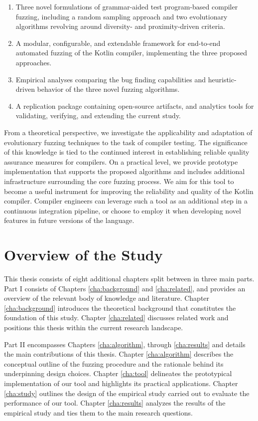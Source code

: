 \begin{enumerate}
	\item Three novel formulations of grammar-aided test program-based compiler fuzzing,
including a random sampling approach
and two evolutionary algorithms revolving
around diversity- and proximity-driven criteria.
	\item A modular, configurable, and extendable framework for
end-to-end automated fuzzing of the Kotlin compiler,
implementing the three proposed approaches.
	\item Empirical analyses comparing the bug finding capabilities
and heuristic-driven behavior of the three novel fuzzing algorithms.
	\item A replication package containing open-source artifacts, and analytics tools
for validating, verifying, and extending the current study.
\end{enumerate}

From a theoretical perspective, we investigate the applicability
and adaptation of evolutionary fuzzing techniques to the task of compiler testing. 
The significance of this knowledge is tied to the continued
interest in establishing reliable quality assurance measures for compilers.
On a practical level, we provide
prototype implementation that supports the proposed algorithms
and includes additional infrastructure surrounding the core fuzzing process.
We aim for this tool to become a useful instrument for improving the 
reliability and quality of the Kotlin compiler.
Compiler engineers can leverage such a tool as an additional
step in a continuous integration pipeline, or choose to employ it
when developing novel features in future versions of the language.

\section{Overview of the Study}

This thesis consists of eight additional chapters split between in three main parts.
Part I consists of Chapters \ref{cha:background} and \ref{cha:related}, and
provides an overview of the relevant body of knowledge and literature.
Chapter \ref{cha:background} introduces the theoretical background
that constitutes the foundation of this study.
Chapter \ref{cha:related} discusses related work and positions this
thesis within the current research landscape.

Part II encompasses Chapters \ref{cha:algorithm}, through \ref{cha:results}
and details the main contributions of this thesis. 
Chapter \ref{cha:algorithm} describes the conceptual outline of
the fuzzing procedure and the rationale behind its
underpinning design choices.
Chapter \ref{cha:tool} delineates the prototypical implementation
of our tool and highlights its practical applications.
Chapter \ref{cha:study} outlines the design of the empirical
study carried out to evaluate the performance of our tool.
Chapter \ref{cha:results} analyzes the results of the empirical study
and ties them to the main research questions.

